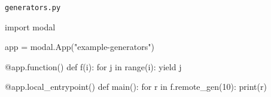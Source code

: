 \documentclass[
  letterpaper,
  DIV=11,
  numbers=noendperiod]{scrreprt}
\newenvironment{Shaded}{\begin{snugshade}}{\end{snugshade}}
\newcommand{\AttributeTok}[1]{\textcolor[rgb]{0.40,0.45,0.13}{#1}}
\newcommand{\BuiltInTok}[1]{\textcolor[rgb]{0.00,0.23,0.31}{#1}}
\newcommand{\ControlFlowTok}[1]{\textcolor[rgb]{0.00,0.23,0.31}{#1}}
\newcommand{\DecValTok}[1]{\textcolor[rgb]{0.68,0.00,0.00}{#1}}
\newcommand{\ImportTok}[1]{\textcolor[rgb]{0.00,0.46,0.62}{#1}}
\newcommand{\KeywordTok}[1]{\textcolor[rgb]{0.00,0.23,0.31}{#1}}
\newcommand{\NormalTok}[1]{\textcolor[rgb]{0.00,0.23,0.31}{#1}}
\newcommand{\OperatorTok}[1]{\textcolor[rgb]{0.37,0.37,0.37}{#1}}
\newcommand{\StringTok}[1]{\textcolor[rgb]{0.13,0.47,0.30}{#1}}
\begin{document}
\begin{codelisting}

\caption{\texttt{generators.py}}

\begin{Shaded}
\begin{Highlighting}[]
\ImportTok{import}\NormalTok{ modal}

\NormalTok{app }\OperatorTok{=}\NormalTok{ modal.App(}\StringTok{"example{-}generators"}\NormalTok{)}


\AttributeTok{@app.function}\NormalTok{()}
\KeywordTok{def}\NormalTok{ f(i):}
    \ControlFlowTok{for}\NormalTok{ j }\KeywordTok{in} \BuiltInTok{range}\NormalTok{(i):}
        \ControlFlowTok{yield}\NormalTok{ j}


\AttributeTok{@app.local\_entrypoint}\NormalTok{()}
\KeywordTok{def}\NormalTok{ main():}
    \ControlFlowTok{for}\NormalTok{ r }\KeywordTok{in}\NormalTok{ f.remote\_gen(}\DecValTok{10}\NormalTok{):}
        \BuiltInTok{print}\NormalTok{(r)}
\end{Highlighting}
\end{Shaded}

\end{codelisting}
\end{document}
